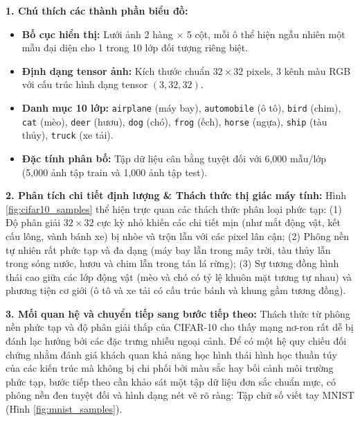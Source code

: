 \documentclass[12pt,a4paper]{article}
\begin{document}
\begin{chartbox}[title={Chú thích \& Phân tích chuyên sâu Mẫu dữ liệu CIFAR-10 (Hình \ref{fig:cifar10_samples})}]
\textbf{\color{blue!80!black}1. Chú thích các thành phần biểu đồ:}
\begin{itemize}[noitemsep,topsep=1pt,leftmargin=15pt]
    \item \textbf{Bố cục hiển thị:} Lưới ảnh 2 hàng $\times$ 5 cột, mỗi ô thể hiện ngẫu nhiên một mẫu đại diện cho 1 trong 10 lớp đối tượng riêng biệt.
    \item \textbf{Định dạng tensor ảnh:} Kích thước chuẩn $32 \times 32$ pixels, 3 kênh màu RGB với cấu trúc hình dạng tensor $(3, 32, 32)$.
    \item \textbf{Danh mục 10 lớp:} \texttt{airplane} (máy bay), \texttt{automobile} (ô tô), \texttt{bird} (chim), \texttt{cat} (mèo), \texttt{deer} (hươu), \texttt{dog} (chó), \texttt{frog} (ếch), \texttt{horse} (ngựa), \texttt{ship} (tàu thủy), \texttt{truck} (xe tải).
    \item \textbf{Đặc tính phân bố:} Tập dữ liệu cân bằng tuyệt đối với 6,000 mẫu/lớp (5,000 ảnh tập train và 1,000 ảnh tập test).
\end{itemize}

\vspace{1mm}
\textbf{\color{blue!80!black}2. Phân tích chi tiết định lượng \& Thách thức thị giác máy tính:}
Hình \ref{fig:cifar10_samples} thể hiện trực quan các thách thức phân loại phức tạp: (1) Độ phân giải $32 \times 32$ cực kỳ nhỏ khiến các chi tiết mịn (như mắt động vật, kết cấu lông, vành bánh xe) bị nhòe và trộn lẫn với các pixel lân cận; (2) Phông nền tự nhiên rất phức tạp và đa dạng (máy bay lẫn trong mây trời, tàu thủy lẫn trong sóng nước, hươu và chim lẫn trong tán lá rừng); (3) Sự tương đồng hình thái cao giữa các lớp động vật (mèo và chó có tỷ lệ khuôn mặt tương tự nhau) và phương tiện cơ giới (ô tô và xe tải có cấu trúc bánh và khung gầm tương đồng).

\vspace{1mm}
\textbf{\color{blue!80!black}3. Mối quan hệ và chuyển tiếp sang bước tiếp theo:}
Thách thức từ phông nền phức tạp và độ phân giải thấp của CIFAR-10 cho thấy mạng nơ-ron rất dễ bị đánh lạc hướng bởi các đặc trưng nhiễu ngoại cảnh. Để có một hệ quy chiếu đối chứng nhằm đánh giá khách quan khả năng học hình thái hình học thuần túy của các kiến trúc mà không bị chi phối bởi màu sắc hay bối cảnh môi trường phức tạp, bước tiếp theo cần khảo sát một tập dữ liệu đơn sắc chuẩn mực, có phông nền đen tuyệt đối và hình dạng nét vẽ rõ ràng: Tập chữ số viết tay MNIST (Hình \ref{fig:mnist_samples}).
\end{chartbox}
\end{document}
